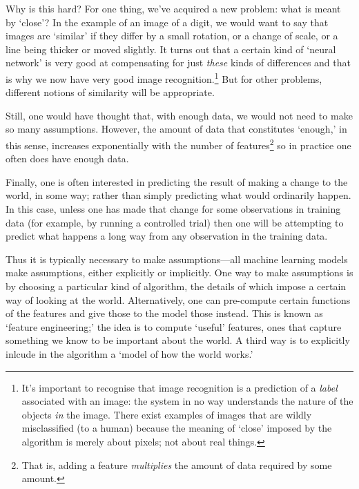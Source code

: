 \documentclass[10pt, a4paper, twocolumn]{article}
\begin{document}
Why is this hard? For one thing, we've acquired a new problem: what is meant by
`close'? In the example of an image of a digit, we would want to say that images
are `similar' if they differ by a small rotation, or a change of scale, or a
line being thicker or moved slightly. It turns out that a certain kind of
`neural network' is very good at compensating for just \emph{these} kinds of
differences and that is why we now have very good image
recognition.\footnote{It's important to recognise that image recognition is a
prediction of a \emph{label} associated with an image: the system in no way
understands the nature of the objects \emph{in} the image. There exist examples
of images that are wildly misclassified (to a human) because the meaning of
`close' imposed by the algorithm is merely about pixels; not about real things.}
But for other problems, different notions of similarity will be appropriate.

Still, one would have thought that, with enough data, we would not need to make
so many assumptions. However, the amount of data that constitutes `enough,' in
this sense, increases exponentially with the number of features\footnote{That
is, adding a feature \emph{multiplies} the amount of data required by some
amount.} so in practice one often does have enough data.

Finally, one is often interested in predicting the result of making a change to
the world, in some way; rather than simply predicting what would ordinarily
happen. In this case, unless one has made that change for some observations in
training data (for example, by running a controlled trial) then one will be
attempting to predict what happens a long way from any observation in the
training data.

Thus it is typically necessary to make assumptions---all machine learning models
make assumptions, either explicitly or implicitly. One way to make assumptions
is by choosing a particular kind of algorithm, the details of which impose a
certain way of looking at the world. Alternatively, one can pre-compute certain
functions of the features and give those to the model those instead. This is
known as `feature engineering;' the idea is to compute `useful' features, ones
that capture something we know to be important about the world. A third way is
to explicitly inlcude in the algorithm a `model of how the world works.'
\end{document}
